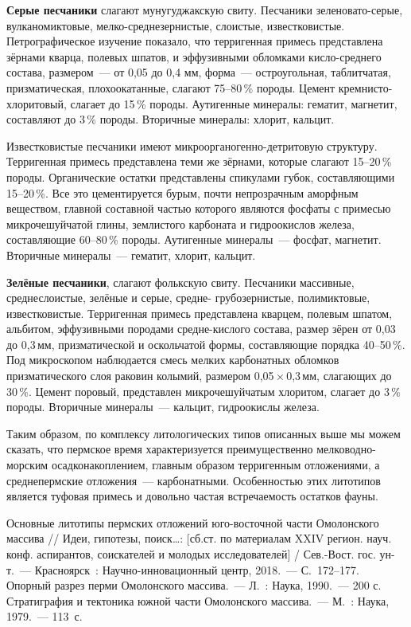 \textbf{Серые песчаники} слагают мунугуджакскую свиту. Песчаники зе\-ле\-но\-ва\-то-серые, вулканомиктовые, мелко-среднезернистые, слоистые, известковистые. Петрографическое изучение показало, что терригенная примесь представлена зёрнами кварца, полевых шпатов, и эффузивными обломками кисло-среднего состава, размером~--- от 0,05 до 0,4 мм, форма~--- остроугольная, таблитчатая, призматическая, плохоокатанные, слагают 75--80\,\% породы. Цемент кремнисто-хлоритовый, слагает до 15\,\% породы. Аутигенные минералы: гематит, магнетит, составляют до 3\,\% породы. Вторичные минералы: хлорит, кальцит.

Известковистые песчаники имеют микроорганогенно-детритовую структуру. Терригенная примесь представлена теми же зёрнами, которые слагают 15--20\,\% породы. Органические остатки представлены спикулами губок, составляющими 15--20\,\%. Все это цементируется бурым, почти непрозрачным аморфным веществом, главной составной частью которого являются фосфаты с примесью микрочешуйчатой глины, землистого карбоната и гидроокислов железа, составляющие 60--80\,\% породы. Аутигенные минералы~--- фосфат, магнетит. Вторичные минералы~--- гематит, хлорит, кальцит.

\textbf{Зелёные песчаники}, слагают фолькскую свиту. Песчаники массивные, среднеслоистые, зелёные и серые, средне- грубозернистые, полимиктовые, известковистые. Терригенная примесь представлена кварцем, полевым шпатом, альбитом, эффузивными породами средне-кислого состава, размер зёрен от 0,03 до 0,3\,мм, призматической и оскольчатой формы, составляющие порядка 40--50\,\%. Под микроскопом наблюдается смесь мелких карбонатных обломков призматического слоя раковин колымий, размером 0,05\,$\times$\,0,3\,мм, слагающих до 30\,\%. Цемент поровый, представлен микрочешуйчатым хлоритом, слагает до 3\,\% породы. Вторичные минералы~--- кальцит, гидроокислы железа.

Таким образом, по комплексу литологических типов описанных выше мы можем сказать, что пермское время характеризуется преимущественно мелководно-морским осадконакоплением, главным образом терригенным отложениями, а среднепермские отложения~--- карбонатными. Особенностью этих литотипов является туфовая примесь и довольно частая встречаемость остатков фауны.

\begin{thebibliography}{99}
\bibitem{} Основные литотипы пермских отложений юго-восточной части Омолонского массива // Идеи, гипотезы, поиск…: [сб.ст. по материалам XXIV регион. науч. конф. аспирантов, соискателей и молодых исследователей] / Сев.-Вост. гос. ун-т.~--- Красноярск~: Научно-инновационный центр, 2018.~--- С.~172--177.
\bibitem{} Опорный разрез перми Омолонского массива.~--- Л.~: Наука, 1990.~--- 200 с.
\bibitem{} Стратиграфия и тектоника южной части Омолонского массива.~--- М.~: Наука, 1979.~--- 113~с.
\end{thebibliography}
\thispagestyle{empty}
